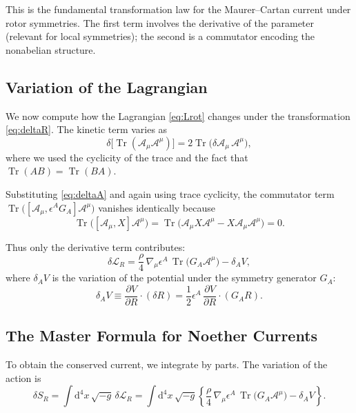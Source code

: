 \documentclass[11pt,a4paper]{article}
\numberwithin{equation}{section}
\theoremstyle{plain}
\theoremstyle{definition}
\theoremstyle{remark}
\DeclareMathOperator{\Tr}{Tr}
\newcommand{\dd}{\mathrm{d}}
\begin{document}
This is the fundamental transformation law for the Maurer--Cartan current under rotor symmetries. The first term involves the derivative of the parameter (relevant for local symmetries); the second is a commutator encoding the nonabelian structure.

\subsection{Variation of the Lagrangian}

We now compute how the Lagrangian \eqref{eq:Lrot} changes under the transformation \eqref{eq:deltaR}. The kinetic term varies as
\begin{equation}
\delta\!\big[\Tr(\mathcal{A}_\mu\mathcal{A}^\mu)\big] = 2\Tr\big(\delta\mathcal{A}_\mu \,\mathcal{A}^\mu\big),
\end{equation}
where we used the cyclicity of the trace and the fact that $\Tr(AB)=\Tr(BA)$.

Substituting \eqref{eq:deltaA} and again using trace cyclicity, the commutator term $\Tr\big([\mathcal{A}_\mu, \epsilon^A G_A]\mathcal{A}^\mu\big)$ vanishes identically because
\begin{equation}
\Tr\big([\mathcal{A}_\mu, X]\mathcal{A}^\mu\big) = \Tr\big(\mathcal{A}_\mu X\mathcal{A}^\mu - X\mathcal{A}_\mu\mathcal{A}^\mu\big) = 0.
\end{equation}

Thus only the derivative term contributes:
\begin{equation}
\delta \mathcal{L}_R = \frac{\rho}{4}\, \nabla_\mu \epsilon^A \,\Tr\!\big(G_A\mathcal{A}^\mu\big) - \delta_A V,
\label{eq:deltaL}
\end{equation}
where $\delta_A V$ is the variation of the potential under the symmetry generator $G_A$:
\begin{equation}
\delta_A V \equiv \frac{\partial V}{\partial R}\cdot (\delta R) = \frac{1}{2}\epsilon^A\,\frac{\partial V}{\partial R}\cdot (G_A R).
\end{equation}

\subsection{The Master Formula for Noether Currents}

To obtain the conserved current, we integrate by parts. The variation of the action is
\begin{equation}
\delta S_R = \int \dd^4x\,\sqrt{-g}\,\delta \mathcal{L}_R = \int \dd^4x\,\sqrt{-g}\left\{\frac{\rho}{4}\, \nabla_\mu \epsilon^A \,\Tr\!\big(G_A\mathcal{A}^\mu\big) - \delta_A V\right\}.
\end{equation}
\end{document}
